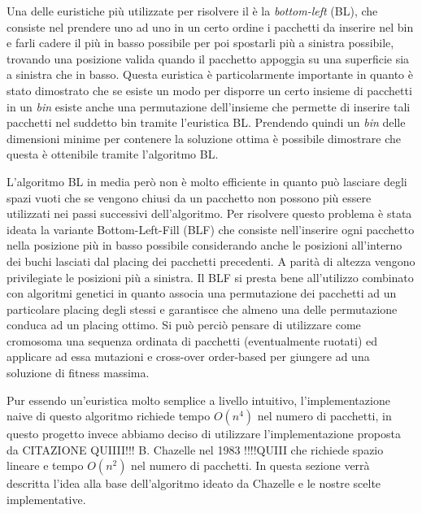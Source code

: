 Una delle euristiche più utilizzate per risolvere il \ddbpp{} è la \emph{bottom-left} (BL), che consiste nel prendere uno ad uno in un certo ordine i pacchetti da inserire nel bin e farli cadere il più in basso possibile per poi spostarli più a sinistra possibile, trovando una posizione valida quando il pacchetto appoggia su una superficie sia a sinistra che in basso. Questa euristica è particolarmente importante in quanto è stato dimostrato che se esiste un modo per disporre un certo insieme di pacchetti in un \emph{bin} esiste anche una permutazione dell'insieme che permette di inserire tali pacchetti nel suddetto bin tramite l'euristica BL. Prendendo quindi un \emph{bin} delle dimensioni minime per contenere la soluzione ottima è possibile dimostrare che questa è ottenibile tramite l'algoritmo BL.

L'algoritmo BL in media però non è molto efficiente in quanto può lasciare degli spazi vuoti che se vengono chiusi da un pacchetto non possono più essere utilizzati nei passi successivi dell'algoritmo. Per risolvere questo problema è stata ideata la variante Bottom-Left-Fill (BLF) che consiste nell'inserire ogni pacchetto nella posizione più in basso possibile considerando anche le posizioni all'interno dei buchi lasciati dal placing dei pacchetti precedenti. A parità di altezza vengono privilegiate le posizioni più a sinistra. Il BLF si presta bene all'utilizzo combinato con algoritmi genetici in quanto associa una permutazione dei pacchetti ad un particolare placing degli stessi e garantisce che almeno una delle permutazione conduca ad un placing ottimo. Si può perciò pensare di utilizzare come cromosoma una sequenza ordinata di pacchetti (eventualmente ruotati) ed applicare ad essa mutazioni e cross-over order-based per giungere ad una soluzione di fitness massima.

Pur essendo un'euristica molto semplice a livello intuitivo, l'implementazione naive di questo algoritmo richiede tempo $O(n^4)$ nel numero di pacchetti, in questo progetto invece abbiamo deciso di utilizzare l'implementazione proposta da CITAZIONE QUIIII!!! B. Chazelle nel 1983 !!!!QUIII che richiede spazio lineare e tempo $O(n^2)$ nel numero di pacchetti. In questa sezione verrà descritta l'idea alla base dell'algoritmo ideato da Chazelle e le nostre scelte implementative. 

